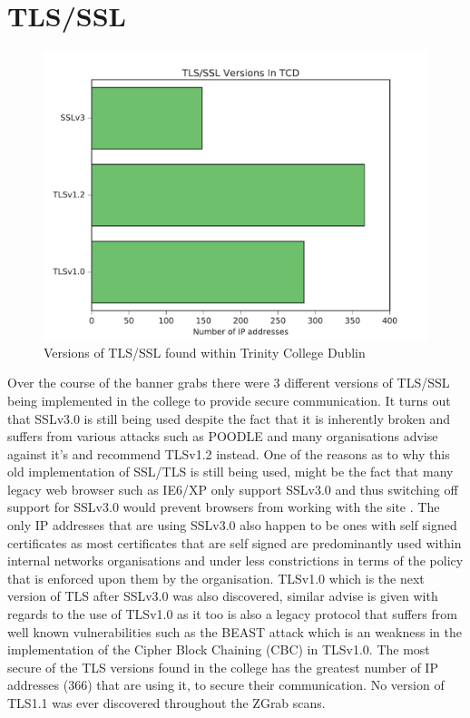 \documentclass[a4wide,leqno,12pt]{report}
\begin{document}
\section{TLS/SSL}
\begin{figure}[H]
\centering
\includegraphics[scale=.5]{pdf_images/TLSVersionsInTCD}
\caption{Versions of TLS/SSL found within Trinity College Dublin}
\label{fig:TLS_SSL}
\end{figure}

Over the course of the banner grabs there were 3 different versions of TLS/SSL being implemented in the college to provide secure communication. It turns out that SSLv3.0 is still being used despite the fact that it is inherently broken and suffers from various attacks such as POODLE\cite{holz2015summarizing} \cite{moller2014poodle} and many organisations \cite{ssllabs} advise against it's and recommend  TLSv1.2 instead. One of the reasons as to why this old implementation of SSL/TLS is still being used, might be the fact that many legacy web browser such as IE6/XP only support SSLv3.0 and thus switching off support for SSLv3.0 would prevent browsers from working with the site \cite{owaspTLS_SSL}. The only IP addresses that are using SSLv3.0 also happen to be ones with self signed certificates as most certificates that are self signed are predominantly  used within internal networks organisations and under less constrictions in terms of the policy that is enforced upon them by the organisation. TLSv1.0 which is the next version of TLS after SSLv3.0 was also discovered, similar advise is given with regards to the use of TLSv1.0 as it too is also a legacy protocol that suffers from well known vulnerabilities such as the BEAST attack\cite{holz2015summarizing} which is an weakness in the implementation of the Cipher Block Chaining (CBC) in TLSv1.0. The most secure of the TLS versions found in the college has the greatest number of IP addresses (366) that are using it, to secure their communication. No version of TLS1.1 was ever discovered throughout the ZGrab scans.
\end{document}
